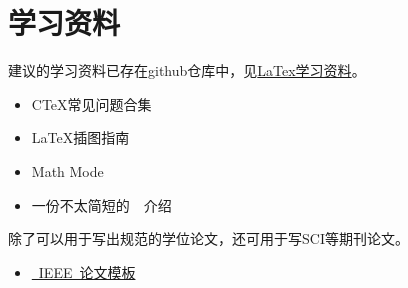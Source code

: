 \chapter{学习资料}
\label{chap:material}

建议的学习资料已存在github仓库中，见\href{https://github.com/BIT-thesis/LaTex-template/tree/master/LaTex%E5%AD%A6%E4%B9%A0%E8%B5%84%E6%96%99}{LaTex学习资料}。

\begin{itemize}
\item C\TeX 常见问题合集
\item \LaTeX 插图指南
\item Math Mode
\item 一份不太简短的~\LaTeXe{}~介绍

\end{itemize}

\LaTex 除了可以用于写出规范的学位论文，还可用于写SCI等期刊论文。

\begin{itemize}
\item \href{http://www.ctan.org/tex-archive/macros/latex/contrib/IEEEtran/}{~IEEE~­论文模板}

\end{itemize}